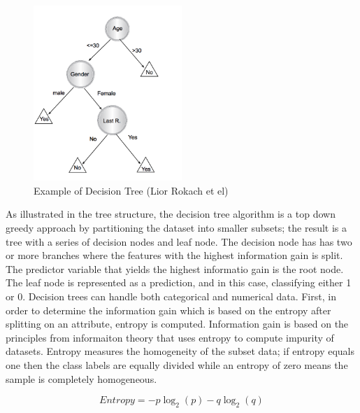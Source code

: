\documentclass{llncs}
\begin{document}
\begin{figure}
\centering
\includegraphics[width=0.5\textwidth]{decisiontree.png}
\caption{Example of Decision Tree (Lior Rokach et el)}
\end{figure}


As illustrated in the tree structure, the decision tree algorithm is a top down greedy approach by partitioning the dataset into smaller subsets; the result is a tree with a series of decision nodes and leaf node. The decision node has has two or more branches where the features with the highest information gain is split. The predictor variable that yields the highest informatio gain is the root node. The leaf node is represented as a prediction, and in this case, classifying either 1 or 0. Decision trees can handle both categorical and numerical data. First, in order to determine the information gain which is based on the entropy after splitting on an attribute, entropy is computed. Information gain is based on the principles from informaiton theory that uses entropy to compute impurity of datasets. Entropy measures the homogeneity of the subset data; if entropy equals one then the class labels are equally divided while an entropy of zero means the sample is completely homogeneous. 


\begin{equation}
Entropy = -p\log_{2}(p) - q\log_{2}(q)
\end{equation}
\end{document}
